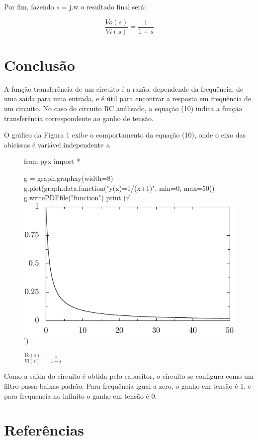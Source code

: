 \documentclass[12pt]{article}
\begin{document}
Por fim, fazendo \textit{s} = j.w o resultado final será:

\begin{equation}
\frac{Vo(s)}{Vi(s)}=\frac{1}{1+\textit{s}}
\end{equation}

\section{Conclusão}
A função transferência de um circuito é a razão, dependende da frequência, de uma saída para uma entrada, e é útil para encontrar a resposta em frequência de um circuito. No caso do circuito RC análisado, a equação (10) indica a função transferência correspondente ao ganho de tensão.

O gráfico da Figura 1 exibe o comportamento da equação (10), onde o eixo das abicissas é variável independente  \textit{s}. 

\begin{figure}[h]
\centering
\begin{pycode}

from pyx import *

g = graph.graphxy(width=8)
g.plot(graph.data.function("y(x)=1/(x+1)", min=0, max=50))
g.writePDFfile("function")
print (r'\includegraphics{function}')
\end{pycode}
\caption{$\frac{Vo(s)}{Vi(s)}=$$\frac{1}{1+s}$}
\end{figure}

Como a saída do circuito é obtida pelo capacitor, o circuito se configura como um filtro passa-baixas padrão. Para frequência igual a zero, o ganho em tensão é 1, e para frequencia no infinito o ganho em tensão é 0.
 

\section{Referências}




\end{document}
